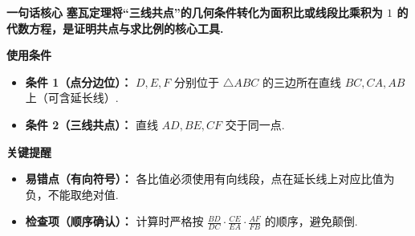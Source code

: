 \begin{summarybox}
	\textbf{\textcolor{CSummary}{一句话核心}}
	\textbf{塞瓦定理将“三线共点”的几何条件转化为面积比或线段比乘积为 $1$ 的代数方程，是证明共点与求比例的核心工具.}

	\medskip
	\textbf{\textcolor{CSummary}{使用条件}}
	\begin{itemize}[leftmargin=*, itemsep=0.5em, topsep=0.4em]
		\item \textbf{条件 1（点分边位）：} $D,E,F$ 分别位于 $\triangle ABC$ 的三边所在直线 $BC,CA,AB$ 上（可含延长线）.
		\item \textbf{条件 2（三线共点）：} 直线 $AD,BE,CF$ 交于同一点.
	\end{itemize}

	\medskip
	\textbf{\textcolor{CSummary}{关键提醒}}
	\begin{itemize}[leftmargin=*, itemsep=0.5em, topsep=0.4em]
		\item \textbf{易错点（有向符号）：} 各比值必须使用有向线段，点在延长线上对应比值为负，不能取绝对值.
		\item \textbf{检查项（顺序确认）：} 计算时严格按 $\frac{BD}{DC}\cdot\frac{CE}{EA}\cdot\frac{AF}{FB}$ 的顺序，避免颠倒.
	\end{itemize}

\end{summarybox}
